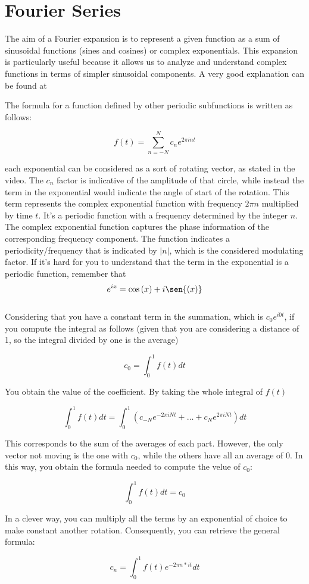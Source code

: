 \section{Fourier Series} \label{chap: fourier}

The aim of a Fourier expansion is to represent a given function as a sum of sinusoidal functions (sines and cosines) or complex exponentials. This expansion is particularly useful because it allows us to analyze and understand complex functions in terms of simpler sinusoidal components. A very good explanation can be found at

The formula for a function defined by other periodic subfunctions is written as follows:

\begin{equation}
    f(t) = \sum_{n = -N}^{N}{c_n e^{2 \pi int}}
\end{equation}

each exponential can be considered as a sort of rotating vector, as stated in the video. The $c_n$ factor is indicative of the amplitude of that circle, while instead the term in the exponential would indicate the angle of start of the rotation. This term represents the complex exponential function with frequency $2 \pi n$ multiplied by time $t$. It's a periodic function with a frequency determined by the integer $n$. The complex exponential function captures the phase information of the corresponding frequency component. The function indicates a periodicity/frequency that is indicated by $|n|$, which is the considered modulating factor.
If it's hard for you to understand that the term in the exponential is a periodic function, remember that
$$
e^{ix} = \cos{(x)} + i \sen{(x)}
$$
\\
Considering that you have a constant term in the summation, which is $c_0 e^{i0t}$, if you compute the integral as follows (given that you are considering a distance of 1, so the integral divided by one is the average)

$$
c_0 = \int_0^1{f(t)dt}
$$

You obtain the value of the coefficient. By taking the whole integral of $f(t)$

$$
\int_0^1{f(t)dt} = \int_0^1{(c_{-N} e^{-2 \pi iNt} + \dots + c_{N} e^{2 \pi iNt})dt}
$$

This corresponds to the sum of the averages of each part. However, the only vector not moving is the one with $c_0$, while the others have all an average of 0. In this way, you obtain the formula needed to compute the velue of $c_0$:

\begin{equation}
    \int_0^1{f(t)dt} = c_0
\end{equation}

In a clever way, you can multiply all the terms by an exponential of choice to make constant another rotation. Consequently, you can retrieve the general formula:

\begin{equation}
    c_n = \int_0^1{f(t) e^{-2 \pi n * it} dt}
\end{equation}
